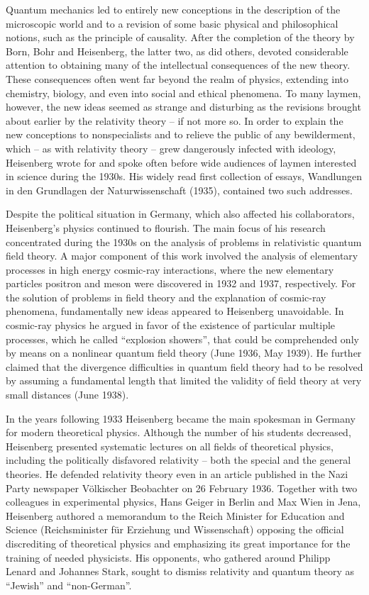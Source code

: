 \documentclass{article}
\begin{document}
Quantum mechanics led to entirely new conceptions in the description of the microscopic world and to a revision of some basic physical and philosophical notions, such as the principle of causality. After the completion of the theory by Born, Bohr and Heisenberg, the latter two, as did others, devoted considerable attention to obtaining many of the intellectual consequences of the new theory. These consequences often went far beyond the realm of physics, extending into chemistry, biology, and even into social and ethical phenomena. To many laymen, however, the new ideas seemed as strange and disturbing as the revisions brought about earlier by the relativity theory – if not more so. In order to explain the new conceptions to nonspecialists and to relieve the public of any bewilderment, which – as with relativity theory – grew dangerously infected with ideology, Heisenberg wrote for and spoke often before wide audiences of laymen interested in science during the 1930s. His widely read first collection of essays, Wandlungen in den Grundlagen der Naturwissenschaft (1935), contained two such addresses.

Despite the political situation in Germany, which also affected his collaborators, Heisenberg's physics continued to flourish. The main focus of his research concentrated during the 1930s on the analysis of problems in relativistic quantum field theory. A major component of this work involved the analysis of elementary processes in high energy cosmic-ray interactions, where the new elementary particles positron and meson were discovered in 1932 and 1937, respectively. For the solution of problems in field theory and the explanation of cosmic-ray phenomena, fundamentally new ideas appeared to Heisenberg unavoidable. In cosmic-ray physics he argued in favor of the existence of particular multiple processes, which he called “explosion showers”, that could be comprehended only by means on a nonlinear quantum field theory (June 1936, May 1939). He further claimed that the divergence difficulties in quantum field theory had to be resolved by assuming a fundamental length that limited the validity of field theory at very small distances (June 1938).

In the years following 1933 Heisenberg became the main spokesman in Germany for modern theoretical physics. Although the number of his students decreased, Heisenberg presented systematic lectures on all fields of theoretical physics, including the politically disfavored relativity – both the special and the general theories. He defended relativity theory even in an article published in the Nazi Party newspaper Völkischer Beobachter on 26 February 1936. Together with two colleagues in experimental physics, Hans Geiger in Berlin and Max Wien in Jena, Heisenberg authored a memorandum to the Reich Minister for Education and Science (Reichsminister für Erziehung und Wissenschaft) opposing the official discrediting of theoretical physics and emphasizing its great importance for the training of needed physicists. His opponents, who gathered around Philipp Lenard and Johannes Stark, sought to dismiss relativity and quantum theory as “Jewish” and “non-German”.
\end{document}
